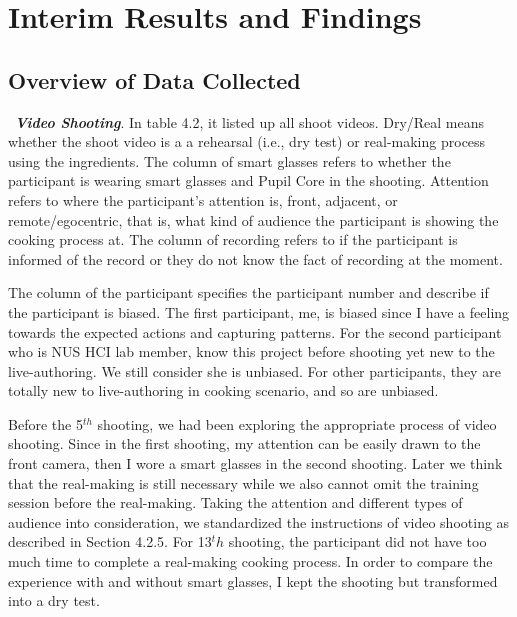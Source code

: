 \documentclass[fyp]{socreport}
\begin{document}
\chapter{Interim Results and Findings}
\section{Overview of Data Collected}
\quad\, \textbf{\textit{Video Shooting}}. In table 4.2, it listed up all shoot videos. Dry/Real means whether the shoot video is a a rehearsal (i.e., dry test) or real-making process using the ingredients. The column of smart glasses refers to whether the participant is wearing smart glasses and Pupil Core in the shooting. Attention refers to where the participant's attention is, front, adjacent, or remote/egocentric, that is, what kind of audience the participant is showing the cooking process at. The column of recording refers to if the participant is informed of the record or they do not know the fact of recording at the moment. 

The column of the participant specifies the participant number and describe if the participant is biased. The first participant, me, is biased since I have a feeling towards the expected actions and capturing patterns. For the second participant who is NUS HCI lab member, know this project before shooting yet new to the live-authoring. We still consider she is unbiased. For other participants, they are totally new to live-authoring in cooking scenario, and so are unbiased. 

Before the 5$^{th}$ shooting, we had been exploring the appropriate process of video shooting. Since in the first shooting, my attention can be easily drawn to the front camera, then I wore a smart glasses in the second shooting. Later we think that the real-making is still necessary while we also cannot omit the training session before the real-making. Taking the attention and different types of audience into consideration, we standardized the instructions of video shooting as described in Section 4.2.5. For 13$^th$ shooting, the participant did not have too much time to complete a real-making cooking process. In order to compare the experience with and without smart glasses, I kept the shooting but transformed into a dry test.
\end{document}
